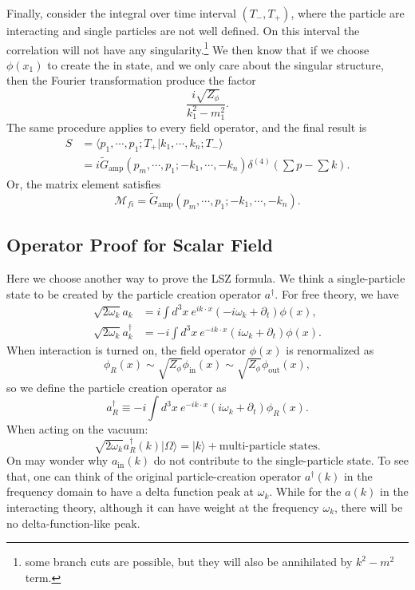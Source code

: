 Finally, consider the integral over time interval $(T_-,T_+)$, where the particle are interacting and single particles are not well defined.
On this interval the correlation will not have any singularity.\footnote{some branch cuts are possible, but they will also be annihilated by $k^2-m^2$ term.}
We then know that if we choose $\phi(x_1)$ to create the in state, and we only care about the singular structure, then the Fourier transformation produce the factor
\begin{equation}
	\frac{i\sqrt{Z_\phi}}{k_1^2-m_1^2}.
\end{equation}
The same procedure applies to every field operator, and the final result is
\begin{equation}
\begin{aligned}
	S &= \langle p_1,\cdots,p_1;T_+|k_1,\cdots,k_n;T_-\rangle \\
	&= i\tilde{G}_{\mathrm{amp}}(p_m,\cdots,p_1;-k_1,\cdots,-k_n) \delta^{(4)}\left(\sum p-\sum k \right).
\end{aligned}
\end{equation}
Or, the matrix element satisfies
\begin{equation}
	\mathcal M_{fi} = \tilde{G}_{\mathrm{amp}}(p_m,\cdots,p_1;-k_1,\cdots,-k_n).
\end{equation}


\subsection{Operator Proof for Scalar Field}
Here we choose another way to prove the LSZ formula.
We think a single-particle state to be created by the particle creation operator $a^\dagger$.
For free theory, we have
\begin{equation}
\begin{aligned}
	\sqrt{2\omega_k} a_k &= i \int d^3 x\ e^{ik\cdot x}(-i\omega_k+\partial_t)\phi(x), \\
	\sqrt{2\omega_k} a^\dagger_k &= -i \int d^3 x\ e^{-ik\cdot x}(i\omega_k+\partial_t)\phi(x).
\end{aligned}
\end{equation}
When interaction is turned on, the field operator $\phi(x)$ is renormalized as
\begin{equation*}
	\phi_R(x) \sim \sqrt{Z_{\phi}} \phi_{\mathrm{in}}(x) \sim \sqrt{Z_{\phi}} \phi_{\mathrm{out}}(x),
\end{equation*}
so we define the particle creation operator as
\begin{equation}
	a_R^\dagger \equiv -i \int d^3 x\ e^{-ik\cdot x}(i\omega_k+\partial_t)\phi_R(x).
\end{equation}
When acting on the vacuum:
\begin{equation}
	\sqrt{2\omega_k} a_R^\dagger(k) |\Omega\rangle = |k\rangle + \text{multi-particle states}.
\end{equation}
On may wonder why $a_{\mathrm{in}}(k)$ do not contribute to the single-particle state. 
To see that, one can think of the original particle-creation operator $a^\dagger(k)$ in the frequency domain to have a delta function peak at $\omega_k$.
While for the $a(k)$ in the interacting theory, although it can have weight at the frequency $\omega_k$, there will be no delta-function-like peak.

